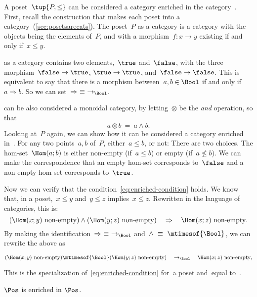 \begin{example}
    A poset~$\tup{P, \leq}$ can be considered a category enriched in the category~\Bool.
    First, recall the construction that makes each poset into a category~(\cref{sec:posetsarecats}).
    The poset~$P$ as a category is a category with the objects being the elements of~$P$, and with a morphism~$f\colon x \to y$ existing if and only if~$x\leq y$.

    \Bool as a category contains two elements,~$\true$ and~$\false$, with the three morphism~$\false \to \true$, $\true \to \true$, and~$\false \to \false$.
    This is equivalent to say that there is a morphism between~$a, b \in \Bool$ if and only if~$a \Rightarrow b$.
    So we can set~$\Rightarrow\ \equiv\ \to_{\Bool}$.

    \Bool can be also considered a monoidal category, by letting~$\otimes$ be the \emph{and} operation, so that
    \begin{equation}
        a \otimes b\ =\ a \wedge b.
    \end{equation}
    Looking at~$P$ again, we can show how it can be considered a category enriched in~\Bool.
    For any two points~$a, b$ of~$P$, either~$a \leq b$, or not: There are two choices.
    The hom-set~$\Hom(a; b)$ is either non-empty (if~$a \leq b$) or empty (if~$a \not\leq b$).
    We can make the correspondence that an empty hom-set corresponds to~$\false$ and a non-empty hom-set corresponds to~$\true$.

    Now we can verify that the condition~\cref{eq:enriched-condition} holds.
    We know that, in a poset,~$x \leq y$ and~$y \leq z$ implies~$x \leq z$.
    Rewritten in the language of categories, this is:
    \begin{equation*}
        (\Hom(x;y)\ \text{non-empty})
        \wedge
        (\Hom(y; z)\ \text{non-empty})
        \quad
        \Rightarrow
        \quad
        \Hom(x; z)\ \text{non-empty}.
    \end{equation*}
    By making the identification~$\Rightarrow\ \equiv\ \to_{\Bool}$ and~$\wedge\ \equiv\ \mtimesof{\Bool}$, we can rewrite the above as
    \begin{widepar}
        \begin{equation*}
            (\Hom(x;y)\ \text{non-empty})
            \mtimesof{\Bool}
            (\Hom(y; z)\ \text{non-empty})
            \quad
            \to_{\Bool}
            \quad
            \Hom(x; z)\ \text{non-empty},
        \end{equation*}
    \end{widepar}
    This is the specialization of~\cref{eq:enriched-condition} for~\CatC a poset and~\CatD equal to~\Bool.
\end{example}
\begin{example}
    $\Pos$ is enriched in $\Pos$.
\end{example}

